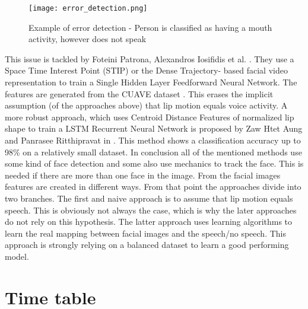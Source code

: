 \begin{figure}
\centering
  \texttt{[image: error\_detection.png]}
  \caption{Example of error detection - Person is classified as
having a mouth activity, however does not speak \cite{Bendris2010}}
  \label{fig:errorDetection}
\end{figure}

This issue is tackled by Foteini Patrona, Alexandros Iosifidis et al. \cite{Patrona2016}.
They use a Space Time Interest Point (STIP) or the Dense Trajectory-
based facial video representation to train a Single Hidden Layer Feedforward Neural Network.
The features are generated from the CUAVE dataset \cite{Patterson2002}.
This erases the implicit assumption (of the approaches above) that lip motion equals voice activity.
A more robust approach, which uses Centroid Distance Features of normalized lip shape to train a LSTM Recurrent Neural Network is proposed by Zaw Htet Aung and Panrasee Ritthipravat in \cite{Aung2015}. This method shows a classification accuracy up to 98\% on a relatively small dataset.
In conclusion all of the mentioned methods use some kind of face detection and some also use mechanics to track the face. This is needed if there are more than one face in the image.
From the facial images features are created in different ways. From that point the approaches divide into two branches.
The first and naive approach is to assume that lip motion equals speech. This is obviously not always the case, which is why the later approaches do not rely on this hypothesis.
The latter approach uses learning algorithms to learn the real mapping between facial images and the speech/no speech. This approach is strongly relying on a balanced dataset to learn a good performing model.


\section{Time table}
%


